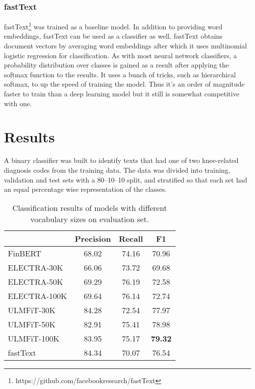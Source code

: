 \subsubsection{fastText}\label{fastText}
fastText\footnote{https://github.com/facebookresearch/fastText} was trained as a baseline model.
In addition to providing word embeddings, fastText can be used as a classifier as well.
fastText obtains document vectors by averaging word embeddings after which it uses multinomial logistic regression for classification.
As with most neural network classifiers, a probability distribution over classes is gained as a result after applying the softmax function to the results.
It uses a bunch of tricks, such as hierarchical softmax, to up the speed of training the model.
Thus it's an order of magnitude faster to train than a deep learning model but it still is somewhat competitive with one.

\section{Results}\label{Results}
A binary classifier was built to identify texts that had one of two knee-related diagnosis codes from the training data.
The data was divided into training, validation and test sets with a 80--10--10 split, and stratified so that each set had an equal percentage wise representation of the classes.

\begin{table}[t]
\begin{center}
\begin{tabular}{lccc}
         & Precision & Recall & F1 \\
        \hline
FinBERT &      68.02   &    74.16 &  70.96   \\
ELECTRA-30K    &     66.06 & 73.72 & 69.68 \\
ELECTRA-50K  &      69.29 & 76.19 & 72.58 \\
ELECTRA-100K  &     69.64 & 76.14 & 72.74 \\
ULMFiT-30K  &    84.28 & 72.54 & 77.97 \\
ULMFiT-50K  &   82.91 & 75.41 & 78.98 \\
ULMFiT-100K  &  83.95 & 75.17 & \textbf{79.32} \\
fastText &  84.34 & 70.07 & 76.54 \\
\end{tabular}
\caption{Classification results of models with different vocabulary sizes on evaluation set.}
\label{table:results}
\end{center}
\end{table}

